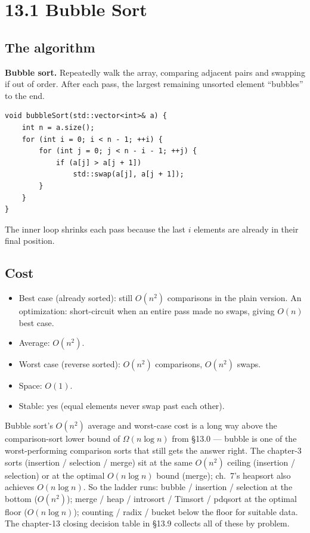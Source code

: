 \documentclass[11pt]{article}
\begin{document}
\section{13.1 Bubble Sort}

\subsection*{The algorithm}

\begin{defnbox}
\textbf{Bubble sort.} Repeatedly walk the array, comparing adjacent pairs and swapping if out of order. After each pass, the largest remaining unsorted element ``bubbles'' to the end.
\end{defnbox}

\begin{lstlisting}[basicstyle=\ttfamily\small,frame=single]
void bubbleSort(std::vector<int>& a) {
    int n = a.size();
    for (int i = 0; i < n - 1; ++i) {
        for (int j = 0; j < n - i - 1; ++j) {
            if (a[j] > a[j + 1])
                std::swap(a[j], a[j + 1]);
        }
    }
}
\end{lstlisting}

The inner loop shrinks each pass because the last $i$ elements are already in their final position.

\subsection*{Cost}

\begin{itemize}[leftmargin=*]
    \item Best case (already sorted): still $O(n^2)$ comparisons in the plain version. An optimization: short-circuit when an entire pass made no swaps, giving $O(n)$ best case.
    \item Average: $O(n^2)$.
    \item Worst case (reverse sorted): $O(n^2)$ comparisons, $O(n^2)$ swaps.
    \item Space: $O(1)$.
    \item Stable: yes (equal elements never swap past each other).
\end{itemize}

\begin{notebox}
Bubble sort's $O(n^2)$ average and worst-case cost is a long way
above the comparison-sort lower bound of $\Omega(n \log n)$ from
\S13.0 --- bubble is one of the worst-performing comparison sorts
that still gets the answer right. The chapter-3 sorts
(insertion / selection / merge) sit at the same $O(n^2)$ ceiling
(insertion / selection) or at the optimal $O(n \log n)$ bound
(merge); ch.~7's heapsort also achieves $O(n \log n)$. So the
ladder runs: bubble / insertion / selection at the bottom
($O(n^2)$); merge / heap / introsort / Timsort / pdqsort at the
optimal floor ($O(n \log n)$); counting / radix / bucket below the
floor for suitable data. The chapter-13 closing decision table in
\S13.9 collects all of these by problem.
\end{notebox}
\end{document}
